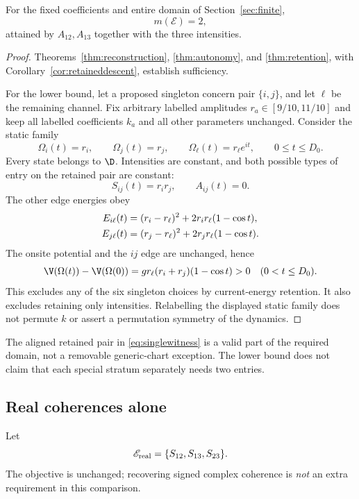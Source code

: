 \begin{theorem}\label{thm:minimum}
For the fixed coefficients and entire domain of Section~\ref{sec:finite},
\[
m(\mathscr E)=2,
\]
attained by \(A_{12},A_{13}\) together with the three intensities.
\end{theorem}
\begin{proof}
Theorems~\ref{thm:reconstruction}, \ref{thm:autonomy}, and \ref{thm:retention}, with Corollary~\ref{cor:retaineddescent}, establish sufficiency.

For the lower bound, let a proposed singleton concern pair \(\{i,j\}\), and let \(\ell\) be the remaining channel. Fix arbitrary labelled amplitudes \(r_a\in[9/10,11/10]\) and keep all labelled coefficients \(k_a\) and all other parameters unchanged. Consider the static family
\begin{equation}
\Omega_i(t)=r_i,\qquad\Omega_j(t)=r_j,\qquad
\Omega_\ell(t)=r_\ell e^{it},\qquad 0\le t\le D_0.
\label{eq:singlewitness}
\end{equation}
Every state belongs to \(\D\). Intensities are constant, and both possible types of entry on the retained pair are constant:
\[
S_{ij}(t)=r_ir_j,\qquad A_{ij}(t)=0.
\]
The other edge energies obey
\begin{align}
E_{i\ell}(t)&=(r_i-r_\ell)^2+2r_ir_\ell(1-\cos t),\notag\\
E_{j\ell}(t)&=(r_j-r_\ell)^2+2r_jr_\ell(1-\cos t).
\end{align}
The onsite potential and the \(ij\) edge are unchanged, hence
\begin{equation}
\V(\Omega(t))-\V(\Omega(0))
=g r_\ell(r_i+r_j)(1-\cos t)>0
\quad(0<t\le D_0).
\label{eq:singleobstruction}
\end{equation}
This excludes any of the six singleton choices by current-energy retention. It also excludes retaining only intensities. Relabelling the displayed static family does not permute \(k\) or assert a permutation symmetry of the dynamics.
\end{proof}

The aligned retained pair in \eqref{eq:singlewitness} is a valid part of the required domain, not a removable generic-chart exception. The lower bound does not claim that each special stratum separately needs two entries.

\subsection{Real coherences alone}
Let
\[
\mathscr E_{\rm real}=\{S_{12},S_{13},S_{23}\}.
\]
The objective is unchanged; recovering signed complex coherence is \emph{not} an extra requirement in this comparison.

